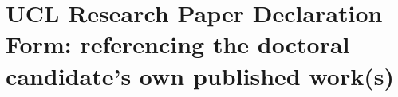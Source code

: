 



%
%
% 

\section*{UCL Research Paper Declaration Form: referencing the doctoral candidate’s own published work(s)}

%
%


